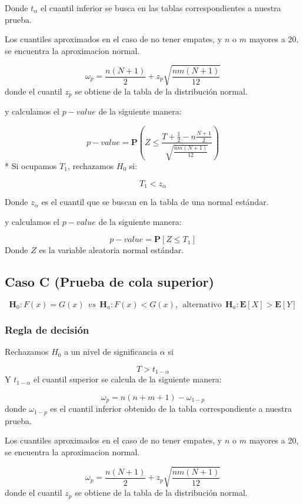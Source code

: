 \documentclass[
  a4paper,
  oneside,
  openany]{book}
\begin{document}
Donde \(t_{\alpha}\) el cuantil inferior se busca en las tablas correspondientes a nuestra prueba.

Los cuantiles aproximados en el caso de no tener empates, y \(n\) o \(m\) mayores a 20, se encuentra la aproximacion normal.

\[\omega_p= \frac{n(N+1)}{2} + z_p\sqrt{\frac{n m(N+1)}{12}}\]
donde el cuantil \(z_p\) se obtiene de la tabla de la distribución normal.

y calculamos el \(p-value\) de la siguiente manera:

\[p-value = \mathbf{P}\left(Z\leq\frac{T+\frac{1}{2}-n\frac{N+1}{2}}{\sqrt{\frac{nm(N+1)}{12}}}\right)\]
* Si ocupamos \(T_{1}\), rechazamos \(H_0\) si:

\[T_{1} < z_{\alpha}\]

Donde \(z_{\alpha}\) es el cuantil que se buscan en la tabla de una normal estándar.

y calculamos el \(p-value\) de la siguiente manera:

\[p-value=\mathbf{P}[Z\leq T_{1}]\]
Donde \(Z\) es la variable aleatoria normal estándar.

\hypertarget{caso-c-prueba-de-cola-superior-3}{%
\subsection*{Caso C (Prueba de cola superior)}\label{caso-c-prueba-de-cola-superior-3}}


\[\textbf{H}_0: F(x) = G(x) \ \ vs \ \ \textbf{H}_a: F(x) < G(x), \  \ \mbox{alternativo} \ \ \textbf{H}_a:\mathbf{E}[X]  > \mathbf{E}[Y]\]

\hypertarget{regla-de-decisiuxf3n-15}{%
\subsubsection*{Regla de decisión}\label{regla-de-decisiuxf3n-15}}


Rechazamos \(H_0\) a un nivel de significancia \(\alpha\) si

\[T > t_{1-{\alpha}}\]
Y \(t_{1-\alpha}\) el cuantil superior se calcula de la siguiente manera:

\[\omega_p= n(n+m+1)-\omega_{1-p}\]
donde \(\omega_{1-p}\) es el cuantil inferior obtenido de la tabla correspondiente a nuestra prueba.

Los cuantiles aproximados en el caso de no tener empates, y \(n\) o \(m\) mayores a 20, se encuentra la aproximacion normal.

\[ \omega_p= \frac{n(N+1)}{2} + z_p\sqrt{\frac{n m(N+1)}{12}}\]
donde el cuantil \(z_p\) se obtiene de la tabla de la distribución normal.
\end{document}
